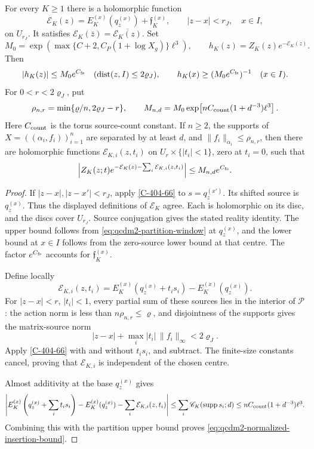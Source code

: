 \documentclass[11pt,letterpaper,reqno]{amsart}
\makeatletter
\theoremstyle{definition}
\newcommand{\ms@minorstart}{%
  \pushQED{\qed}\renewcommand{\qedsymbol}{$\blacksquare$}}
\newenvironment{proposition}[1][]{\ms@minorstart\ms@proposition[#1]}
  {\popQED\endms@proposition}
\theoremstyle{remark}
\makeatother
\begin{document}
\begin{proposition}[A common normalizer]\label{C-404-67}
For every \(K\ge1\) there is a holomorphic function
\[
 \mathcal E_K(z)
   =E_K^{(x)}(q_z^{(x)})+\mathfrak f_K^{(x)},
 \qquad |z-x|<r_J,\quad x\in I,
\]
on \(U_{r_J}\). It satisfies
\(\mathcal E_K(\bar z)=\overline{\mathcal E_K(z)}\).
Set
\[
 M_0=\exp\!\left(\max\{C+2,C_P(1+\log X_g)\}\ell^3\right),
 \qquad h_K(z)=Z_K(z)e^{-\mathcal E_K(z)}.
\]
Then
\begin{equation}\label{eq:qcdm2-common-normalizer}
 |h_K(z)|\le M_0e^{C_{\rm fs}}
       \quad(\operatorname{dist}(z,I)\le2\varrho_J),\qquad
 h_K(x)\ge(M_0e^{C_{\rm fs}})^{-1}\quad(x\in I).
\end{equation}
For \(0<r<2\varrho_J\), put
\[
 \rho_{n,r}=\min\{\varrho/n,2\varrho_J-r\},\qquad
 M_{n,d}=M_0\exp\!\left[nC_{\rm count}(1+d^{-3})\ell^3\right].
\]
Here \(C_{\rm count}\) is the torus source-count constant.
If \(n\ge2\), the supports of \(X=((\alpha_i,f_i))_{i=1}^n\)
are separated by at least \(d\), and
\(\|f_i\|_{\alpha_i}\le\rho_{n,r}\), then there are holomorphic
functions \(\mathcal E_{K,i}(z,t_i)\) on
\(U_r\times\{|t_i|<1\}\), zero at \(t_i=0\), such that
\begin{equation}\label{eq:qcdm2-normalized-insertion-bound}
 \left|Z_K(z;t)
  e^{-\mathcal E_K(z)-\sum_i\mathcal E_{K,i}(z,t_i)}\right|
       \le M_{n,d}e^{C_{\rm fs}} .
\end{equation}
\end{proposition}

\begin{proof}
If \(|z-x|,|z-x'|<r_J\), apply \cref{C-404-66} to
\(s=q_z^{(x')}\). Its shifted source is \(q_z^{(x)}\).
Thus the displayed definitions of \(\mathcal E_K\) agree.
Each is holomorphic on its disc, and the discs cover \(U_{r_J}\).
Source conjugation gives the stated reality identity.
The upper bound follows from \eqref{eq:qcdm2-partition-window}
at \(q_z^{(x)}\), and the lower bound at \(x\in I\)
follows from the zero-source lower bound at that centre.
The factor \(e^{C_{\rm fs}}\) accounts for
\(\mathfrak f_K^{(x)}\).

Define locally
\[
 \mathcal E_{K,i}(z,t_i)
   =E_K^{(x)}(q_z^{(x)}+t_is_i)-E_K^{(x)}(q_z^{(x)}).
\]
For \(|z-x|<r\), \(|t_i|<1\), every partial sum of these
sources lies in the interior of \(\mathcal P\): the action
norm is less than \(n\rho_{n,r}\le\varrho\), and disjointness
of the supports gives the matrix-source norm
\[
 |z-x|+\max_i|t_i|\,\|f_i\|_\infty<2\varrho_J.
\]
Apply \cref{C-404-66} with and without \(t_is_i\), and
subtract. The finite-size constants cancel, proving that
\(\mathcal E_{K,i}\) is independent of the chosen centre.

Almost additivity at the base \(q_z^{(x)}\) gives
\[
 \left|E_K^{(x)}\left(q_z^{(x)}+\sum_i t_is_i\right)
       -E_K^{(x)}(q_z^{(x)})
       -\sum_i\mathcal E_{K,i}(z,t_i)\right|
 \le\sum_i\mathscr C_K(\operatorname{supp}s_i;d)
 \le nC_{\rm count}(1+d^{-3})\ell^3.
\]
Combining this with the partition upper bound proves
\eqref{eq:qcdm2-normalized-insertion-bound}.
\end{proof}
\end{document}
